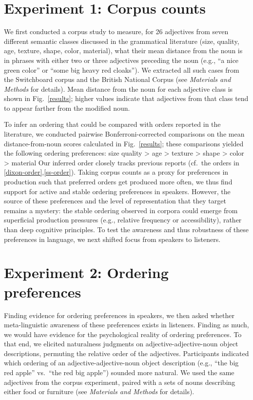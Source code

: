 \documentclass{pnastwo}
\begin{document}
\begin{article}
\section{Experiment 1: Corpus counts}

We first conducted a corpus study to measure, for 26 adjectives from seven different semantic classes discussed in the grammatical literature (size, quality, age, texture, shape, color, material), what their mean distance from the noun is in phrases with either two or three adjectives preceding the noun (e.g., ``a nice green color'' or ``some big heavy red cloaks''). We extracted all such cases from the Switchboard corpus and the British National Corpus (see \emph{Materials and Methods} for details). Mean distance from the noun for each adjective class is shown in Fig.~\ref{results}; higher values indicate that adjectives from that class tend to appear farther from the modified noun.

To infer an ordering that could be compared with orders reported in the literature, we conducted pairwise Bonferroni-corrected comparisons on the mean distance-from-noun scores calculated in Fig.~\ref{results}; these comparisons yielded the following ordering preferences:
\be size \geq quality > age > texture > shape > color > material \label{inferred-order-preferences}\ee
Our inferred order closely tracks previous reports (cf.~the orders in \ref{dixon-order},\ref{ss-order}). Taking corpus counts as a proxy for preferences in production such that preferred orders get produced more often, we thus find support for active and stable ordering preferences in speakers. However, the source of these preferences and the level of representation that they target remains a mystery: the stable ordering observed in corpora could emerge from superficial production pressures (e.g., relative frequency or accessibility), rather than deep cognitive principles. To test the awareness and thus robustness of these preferences in language, we next shifted focus from speakers to listeners.

\section{Experiment 2: Ordering preferences}
Finding evidence for ordering preferences in speakers, we then asked whether meta-linguistic awareness of these preferences exists in listeners. Finding as much, we would have evidence for the psychological reality of ordering preferences. To that end, we elicited naturalness judgments on adjective-adjective-noun object descriptions, permuting the relative order of the adjectives. Participants indicated which ordering of an adjective-adjective-noun object description (e.g., ``the big red apple'' vs.\ ``the red big apple'') sounded more natural. We used the same adjectives from the corpus experiment, paired with a sets of nouns describing either food or furniture (see \emph{Materials and Methods} for details).


\end{article}
\end{document}
